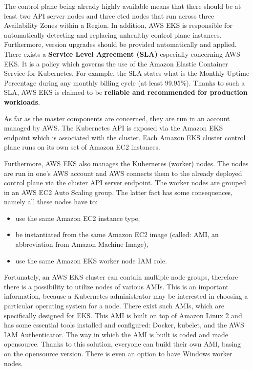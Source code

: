 The control plane being already highly available means that there should be at least two API server nodes and three etcd nodes that run across three Availability Zones within a Region. In addition, AWS EKS is responsible for automatically detecting and replacing unhealthy control plane instances. Furthermore, version upgrades should be provided automatically and applied\cite{what-is-eks}. There exists a \textbf{Service Level Agreement (SLA)} especially concerning AWS EKS. It is a policy which governs the use of the Amazon Elastic Container Service for Kubernetes. For example, the SLA states what is the Monthly Uptime Percentage during any monthly billing cycle (at least 99.95\%)\cite{eks-sla}. Thanks to such a SLA, AWS EKS is claimed to be \textbf{reliable and recommended for production workloads}\cite{what-is-eks}.

As far as the master components are concerned, they are run in an account managed by AWS. The Kubernetes API is exposed via the Amazon EKS endpoint which is associated with the cluster. Each Amazon EKS cluster control plane runs on its own set of Amazon EC2 instances\cite{eks-clusters}.

Furthermore, AWS EKS also manages the Kubernetes (worker) nodes. The nodes are run in one's AWS account and AWS connects them to the already deployed control plane via the cluster API server endpoint. The worker nodes are grouped in an AWS EC2 Auto Scaling group. The latter fact has some consequences, namely all these nodes have to\cite{eks-worker}:
\begin{itemize}
\item use the same Amazon EC2 instance type,
\item be instantiated from the same Amazon EC2 image (called: AMI, an abbreviation from Amazon Machine Image\cite{aws-ami}),
\item use the same Amazon EKS worker node IAM role.
\end{itemize}

Fortunately, an AWS EKS cluster can contain multiple node groups, therefore there is a possibility to utilize nodes of various AMIs\cite{eks-worker}. This is an important information, because a Kubernetes administrator may be interested in choosing a particular operating system for a node. There exist such AMIs, which are specifically designed for EKS. This AMI is built on top of Amazon Linux 2 and has some essential tools installed and configured: Docker, kubelet, and the AWS IAM Authenticator. The way in which the AMI is built is coded and made opensource. Thanks to this solution, everyone can build their own AMI, basing on the opensource version\cite{eks-optimized-ami}. There is even an option to have Windows worker nodes\cite{eks-worker-win}.


